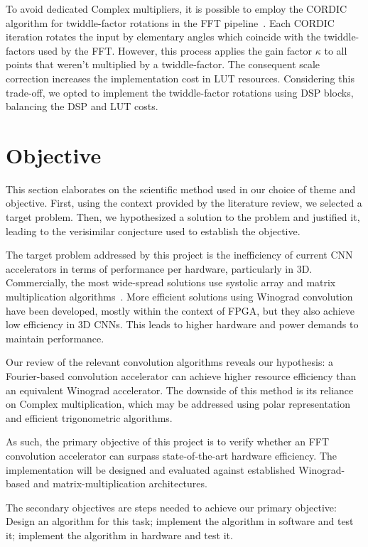 To avoid dedicated Complex multipliers, it is possible to employ the CORDIC algorithm for twiddle-factor rotations in the FFT pipeline~\cite{banerjee2001fpga,choudhary2011cordic}. Each CORDIC iteration rotates the input by elementary angles which coincide with the twiddle-factors used by the FFT. However, this process applies the gain factor $\kappa$ to all points that weren't multiplied by a twiddle-factor. The consequent scale correction increases the implementation cost in LUT resources. Considering this trade-off, we opted to implement the twiddle-factor rotations using DSP blocks, balancing the DSP and LUT costs.

\chapter{Objective}\label{ch:obj}

This section elaborates on the scientific method used in our choice of theme and objective. First, using the context provided by the literature review, we selected a target problem. Then, we hypothesized a solution to the problem and justified it, leading to the verisimilar conjecture used to establish the objective.

The target problem addressed by this project is the inefficiency of current CNN accelerators in terms of performance per hardware, particularly in 3D. Commercially, the most wide-spread solutions use systolic array and matrix multiplication algorithms~\cite{jouppi2020domain}. More efficient solutions using Winograd convolution have been developed, mostly within the context of FPGA, but they also achieve low efficiency in 3D CNNs. This leads to higher hardware and power demands to maintain performance.

Our review of the relevant convolution algorithms reveals our hypothesis: a Fourier-based convolution accelerator can achieve higher resource efficiency than an equivalent Winograd accelerator. The downside of this method is its reliance on Complex multiplication, which may be addressed using polar representation and efficient trigonometric algorithms.

As such, the primary objective of this project is to verify whether an FFT convolution accelerator can surpass state-of-the-art hardware efficiency. The implementation will be designed and evaluated against established Winograd-based and matrix-multiplication architectures.

The secondary objectives are steps needed to achieve our primary objective: Design an algorithm for this task; implement the algorithm in software and test it; implement the algorithm in hardware and test it.

